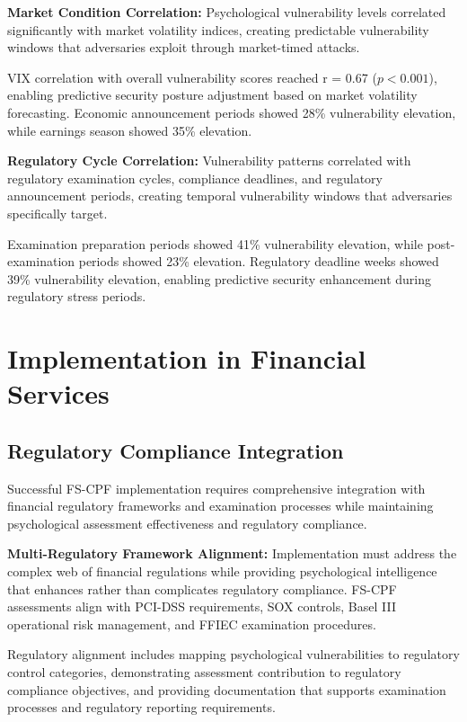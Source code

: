 \documentclass[10pt, twocolumn]{article}
\begin{document}
\textbf{Market Condition Correlation:} Psychological vulnerability levels correlated significantly with market volatility indices, creating predictable vulnerability windows that adversaries exploit through market-timed attacks.

VIX correlation with overall vulnerability scores reached r = 0.67 ($p < 0.001$), enabling predictive security posture adjustment based on market volatility forecasting. Economic announcement periods showed 28\% vulnerability elevation, while earnings season showed 35\% elevation.

\textbf{Regulatory Cycle Correlation:} Vulnerability patterns correlated with regulatory examination cycles, compliance deadlines, and regulatory announcement periods, creating temporal vulnerability windows that adversaries specifically target.

Examination preparation periods showed 41\% vulnerability elevation, while post-examination periods showed 23\% elevation. Regulatory deadline weeks showed 39\% vulnerability elevation, enabling predictive security enhancement during regulatory stress periods.

\section{Implementation in Financial Services}

\subsection{Regulatory Compliance Integration}

Successful FS-CPF implementation requires comprehensive integration with financial regulatory frameworks and examination processes while maintaining psychological assessment effectiveness and regulatory compliance.

\textbf{Multi-Regulatory Framework Alignment:} Implementation must address the complex web of financial regulations while providing psychological intelligence that enhances rather than complicates regulatory compliance. FS-CPF assessments align with PCI-DSS requirements, SOX controls, Basel III operational risk management, and FFIEC examination procedures.

Regulatory alignment includes mapping psychological vulnerabilities to regulatory control categories, demonstrating assessment contribution to regulatory compliance objectives, and providing documentation that supports examination processes and regulatory reporting requirements.
\end{document}
